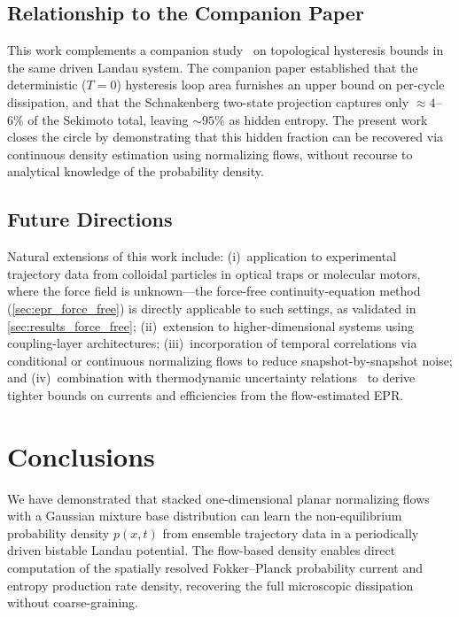 \subsection{Relationship to the Companion Paper}

This work complements a companion study~\cite{FernandezCaballero2026} on topological hysteresis bounds in the same driven Landau system.
The companion paper established that the deterministic ($T = 0$) hysteresis loop area furnishes an upper bound on per-cycle dissipation, and that the Schnakenberg two-state projection captures only $\approx\num{4}$--$\num{6}\%$ of the Sekimoto total, leaving $\sim\!\num{95}\%$ as hidden entropy.
The present work closes the circle by demonstrating that this hidden fraction can be recovered via continuous density estimation using normalizing flows, without recourse to analytical knowledge of the probability density.

\subsection{Future Directions}

Natural extensions of this work include:
(i)~application to experimental trajectory data from colloidal particles in optical traps or molecular motors, where the force field is unknown---the force-free continuity-equation method (\cref{sec:epr_force_free}) is directly applicable to such settings, as validated in \cref{sec:results_force_free};
(ii)~extension to higher-dimensional systems using coupling-layer architectures;
(iii)~incorporation of temporal correlations via conditional or continuous normalizing flows to reduce snapshot-by-snapshot noise;
and (iv)~combination with thermodynamic uncertainty relations~\cite{Barato2015,Gingrich2016} to derive tighter bounds on currents and efficiencies from the flow-estimated EPR.


\section{Conclusions}
\label{sec:conclusions}

We have demonstrated that stacked one-dimensional planar normalizing flows with a Gaussian mixture base distribution can learn the non-equilibrium probability density $p(x,t)$ from ensemble trajectory data in a periodically driven bistable Landau potential.
The flow-based density enables direct computation of the spatially resolved Fokker--Planck probability current and entropy production rate density, recovering the full microscopic dissipation without coarse-graining.

